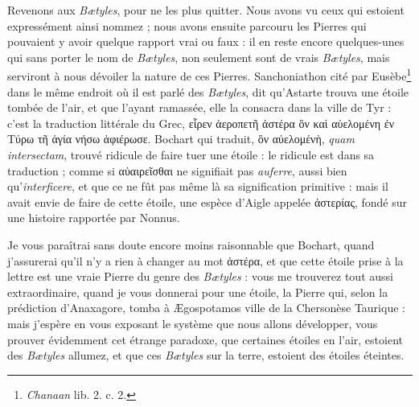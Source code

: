 \documentclass[a4paper, 11pt, oneside, polutonikogreek, french]{article}
\begin{document}
Revenons aux \emph{Bætyles}, pour ne les plus quitter. Nous avons vu ceux qui estoient expressément ainsi nommez ; nous avons ensuite parcouru les Pierres qui pouvaient y avoir quelque rapport vrai ou faux : il en reste encore quelques-unes qui sans porter le nom de \emph{Bætyles}, non seulement sont de vrais \emph{Bætyles}, mais serviront à nous dévoiler la nature de ces Pierres. Sanchoniathon cité par Eusèbe\footnote{\emph{Chanaan} lib. 2. c. 2.} dans le même endroit où il est parlé des \emph{Bætyles}, dit qu'Astarte trouva une étoile tombée de l'air, et que l'ayant ramassée, elle la consacra dans la ville de Tyr : c'est la traduction littérale du Grec, εἷρεν ἀεροπετῆ ἀστέρα ὃν καὶ αὐελομένη ἐν Τύρω τῆ ἁγία νήσω ἀφιέρωσε. Bochart qui traduit, ὃν αὐελομένὴ, \emph{quam intersectam}, trouvé ridicule de faire tuer une étoile : le ridicule est dans sa traduction ; comme si αὐαιρεῖσθαι ne signifiait pas \emph{auferre}, aussi bien qu'\emph{interficere}, et que ce ne fût pas même là sa signification primitive : mais il avait envie de faire de cette étoile, une espèce d'Aigle appelée ἀστερίας, fondé sur une histoire rapportée par Nonnus.

Je vous paraîtrai sans doute encore moins raisonnable que Bochart, quand j'assurerai qu'il n'y a rien à changer au mot ἀστέρα, et que cette étoile prise à la lettre est une vraie Pierre du genre des \emph{Bætyles} : vous me trouverez tout aussi extraordinaire, quand je vous donnerai pour une étoile, la Pierre qui, selon la prédiction d'Anaxagore, tomba à Ægospotamos ville de la Chersonèse Taurique : mais j'espère en vous exposant le système que nous allons développer, vous prouver évidemment cet étrange paradoxe, que certaines étoiles en l'air, estoient des \emph{Bætyles} allumez, et que ces \emph{Bætyles} sur la terre, estoient des étoiles éteintes.
\end{document}
